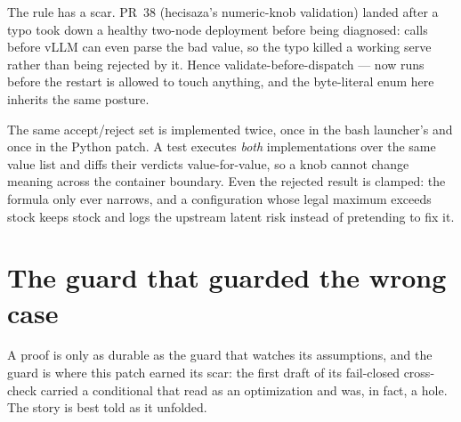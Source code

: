The rule has a scar. PR~38 (hecisaza's numeric-knob
validation) landed after a  typo took down a
healthy two-node deployment before being diagnosed:  calls  before vLLM can even parse the bad value, so the
typo killed a working serve rather than being rejected by it. Hence
validate-before-dispatch ---  now runs
before the restart is allowed to touch anything, and the byte-literal enum
here inherits the same posture.

The same accept/reject set is implemented twice, once in the bash
launcher's  and once in the Python patch. A
test executes \emph{both} implementations over the same value list and diffs
their verdicts value-for-value, so a knob cannot change meaning across the
container boundary. Even the rejected result is clamped: the formula only ever
narrows, and a configuration whose legal maximum exceeds stock keeps stock and
logs the upstream latent risk instead of pretending to fix it.

\section{The guard that guarded the wrong case}
\label{sec:proof-guard}

A proof is only as durable as the guard that watches its assumptions, and
the guard is where this patch earned its scar: the first draft of its
fail-closed cross-check carried a conditional that read as an optimization
and was, in fact, a hole. The story is best told as it unfolded.

